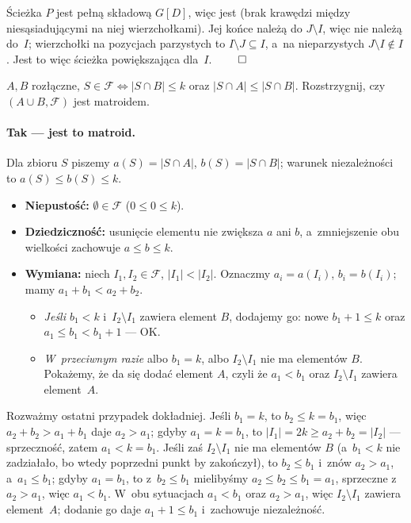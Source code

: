 Ścieżka $P$ jest pełną składową $G[D]$, więc jest  (brak
krawędzi między niesąsiadującymi na niej wierzchołkami). Jej końce należą do
$J\setminus I$, więc nie należą do~$I$; wierzchołki na pozycjach parzystych
to $I\setminus J\subseteq I$, a~na nieparzystych $J\setminus I\notin I$. Jest to
więc ścieżka powiększająca dla~$I$. $\qed$

\clearpage
\begin{zadanie}
	$A,B$ rozłączne, $S\in\mathcal{F}\iff|S\cap B|\le k$ oraz $|S\cap A|\le|S\cap B|$.
	Rozstrzygnij, czy $(A\cup B,\mathcal{F})$ jest matroidem.
\end{zadanie}

\paragraph{Tak --- jest to matroid.}
Dla zbioru $S$ piszemy $a(S)=|S\cap A|$, $b(S)=|S\cap B|$; warunek
niezależności to $a(S)\le b(S)\le k$.

\begin{itemize}[nosep]
	\item \textbf{Niepustość:} $\emptyset\in\mathcal{F}$ ($0\le 0\le k$).
	\item \textbf{Dziedziczność:} usunięcie elementu nie zwiększa $a$ ani $b$,
	      a~zmniejszenie obu wielkości zachowuje $a\le b\le k$.
	\item \textbf{Wymiana:} niech $I_1,I_2\in\mathcal{F}$, $|I_1|<|I_2|$. Oznaczmy
	      $a_i=a(I_i)$, $b_i=b(I_i)$; mamy $a_1+b_1<a_2+b_2$.
	      \begin{itemize}[nosep]
	      	\item \emph{Jeśli $b_1<k$} i~$I_2\setminus I_1$ zawiera element $B$,
	      	      dodajemy go: nowe $b_1{+}1\le k$ oraz $a_1\le b_1<b_1{+}1$ --- OK.
	      	\item \emph{W~przeciwnym razie} albo $b_1=k$, albo $I_2\setminus I_1$
	      	      nie ma elementów $B$. Pokażemy, że da się dodać element $A$, czyli
	      	      że $a_1<b_1$ oraz $I_2\setminus I_1$ zawiera element~$A$.
	      \end{itemize}
\end{itemize}
Rozważmy ostatni przypadek dokładniej. Jeśli $b_1=k$, to $b_2\le k=b_1$, więc
$a_2+b_2>a_1+b_1$ daje $a_2>a_1$; gdyby $a_1=k=b_1$, to $|I_1|=2k\ge a_2+b_2=|I_2|$
--- sprzeczność, zatem $a_1<k=b_1$. Jeśli zaś $I_2\setminus I_1$ nie ma elementów
$B$ (a~$b_1<k$ nie zadziałało, bo wtedy poprzedni punkt by zakończył), to
$b_2\le b_1$ i~znów $a_2>a_1$, a~$a_1\le b_1$; gdyby $a_1=b_1$, to z~$b_2\le b_1$
mielibyśmy $a_2\le b_2\le b_1=a_1$, sprzeczne z~$a_2>a_1$, więc $a_1<b_1$.
W~obu sytuacjach $a_1<b_1$ oraz $a_2>a_1$, więc $I_2\setminus I_1$ zawiera
element~$A$; dodanie go daje $a_1{+}1\le b_1$ i~zachowuje niezależność.
\smallskip

